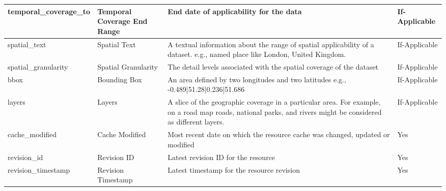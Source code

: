 \begin{center}
{\begin{longtable}[h]{|l|p{2cm}|p{9cm}|c|}
temporal\_coverage\_to            & Temporal Coverage End Range      & End date of applicability for the data                                                                                                                                                         & \multicolumn{1}{l|}{If-Applicable}  \\ \hline
spatial\_text                     & Spatial Text                     & A textual information about the range of spatial applicability of a dataset. e.g., named place like London, United Kingdom.                                                                    & \multicolumn{1}{l|}{If-Applicable}  \\ \hline
spatial\_granularity              & Spatial Granularity              & The detail levels associated with the spatial coverage of the dataset                                                                                                                          & \multicolumn{1}{l|}{If-Applicable}  \\ \hline
bbox                              & Bounding Box                     & An area defined by two longitudes and two latitudes e.g., -0.489|51.28|0.236|51.686                                                                                                            & \multicolumn{1}{l|}{If-Applicable}  \\ \hline
layers                            & Layers                           & A slice  of the geographic coverage in a particular area. For example, on a road map roads, national parks, and rivers might be considered as different layers.                                & \multicolumn{1}{l|}{If-Applicable}  \\ \hline
cache\_modified                   & Cache Modified                   & Most recent date on which the resource cache was changed, updated or modified                                                                                                                  & \multicolumn{1}{l|}{Yes}            \\ \hline
revision\_id                      & Revision ID                      & Latest revision ID for the resource                                                                                                                                                            & \multicolumn{1}{l|}{Yes}            \\ \hline
revision\_timestamp               & Revision Timestamp               & Latest timestamp for the resource revision                                                                                                                                                     & \multicolumn{1}{l|}{Yes}            \\ \hline

\end{longtable}}
\end{center}
